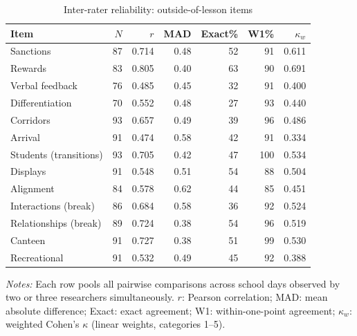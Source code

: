 \begin{table}[htbp]
\centering
\caption{Inter-rater reliability: outside-of-lesson items}
\label{tab:irr_outside}
\small
\begin{tabular}{lrrrrrr}
\toprule
Item & $N$ & $r$ & MAD & Exact\% & W1\% & $\kappa_w$ \\
\midrule
Sanctions & 87 & 0.714 & 0.48 & 52 & 91 & 0.611 \\
Rewards & 83 & 0.805 & 0.40 & 63 & 90 & 0.691 \\
Verbal feedback & 76 & 0.485 & 0.45 & 32 & 91 & 0.400 \\
Differentiation & 70 & 0.552 & 0.48 & 27 & 93 & 0.440 \\
Corridors & 93 & 0.657 & 0.49 & 39 & 96 & 0.486 \\
Arrival & 91 & 0.474 & 0.58 & 42 & 91 & 0.334 \\
Students (transitions) & 93 & 0.705 & 0.42 & 47 & 100 & 0.534 \\
Displays & 91 & 0.548 & 0.51 & 54 & 88 & 0.504 \\
Alignment & 84 & 0.578 & 0.62 & 44 & 85 & 0.451 \\
Interactions (break) & 86 & 0.684 & 0.58 & 36 & 92 & 0.524 \\
Relationships (break) & 89 & 0.724 & 0.38 & 54 & 96 & 0.519 \\
Canteen & 91 & 0.727 & 0.38 & 51 & 99 & 0.530 \\
Recreational & 91 & 0.532 & 0.49 & 45 & 92 & 0.388 \\
\bottomrule
\end{tabular}
\begin{minipage}{\linewidth}
\smallskip
\footnotesize\textit{Notes:} Each row pools all pairwise comparisons across school days observed by two or three researchers simultaneously. $r$: Pearson correlation; MAD: mean absolute difference; Exact: exact agreement; W1: within-one-point agreement; $\kappa_w$: weighted Cohen's $\kappa$ (linear weights, categories 1--5).
\end{minipage}
\end{table}
